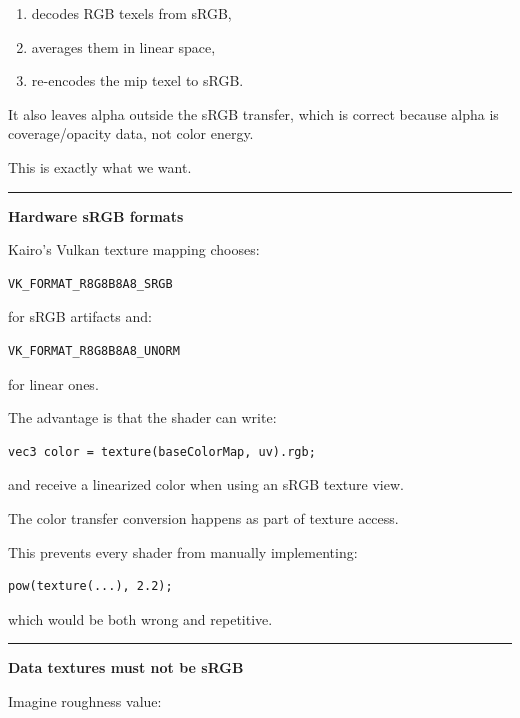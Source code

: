 \begin{enumerate}
\def\labelenumi{\arabic{enumi}.}
\tightlist
\item
  decodes RGB texels from sRGB,
\item
  averages them in linear space,
\item
  re-encodes the mip texel to sRGB.
\end{enumerate}

It also leaves alpha outside the sRGB transfer, which is correct because alpha is coverage/opacity data, not color energy.

This is exactly what we want.

\begin{center}\rule{0.5\linewidth}{0.5pt}\end{center}

\textbf{Hardware sRGB formats}

Kairo's Vulkan texture mapping chooses:

\begin{verbatim}
VK_FORMAT_R8G8B8A8_SRGB
\end{verbatim}

for sRGB artifacts and:

\begin{verbatim}
VK_FORMAT_R8G8B8A8_UNORM
\end{verbatim}

for linear ones.

The advantage is that the shader can write:

\begin{verbatim}
vec3 color = texture(baseColorMap, uv).rgb;
\end{verbatim}

and receive a linearized color when using an sRGB texture view.

The color transfer conversion happens as part of texture access.

This prevents every shader from manually implementing:

\begin{verbatim}
pow(texture(...), 2.2);
\end{verbatim}

which would be both wrong and repetitive.

\begin{center}\rule{0.5\linewidth}{0.5pt}\end{center}

\textbf{Data textures must not be sRGB}

Imagine roughness value:

